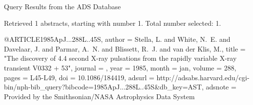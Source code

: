 Query Results from the ADS Database


Retrieved 1 abstracts, starting with number 1.  Total number selected: 1.

@ARTICLE{1985ApJ...288L..45S,
   author = {{Stella}, L. and {White}, N.~E. and {Davelaar}, J. and {Parmar}, A.~N. and 
	{Blissett}, R.~J. and {van der Klis}, M.},
    title = "{The discovery of 4.4 second X-ray pulsations from the rapidly variable X-ray transient V0332 + 53}",
  journal = {\apjl},
     year = 1985,
    month = jan,
   volume = 288,
    pages = {L45-L49},
      doi = {10.1086/184419},
   adsurl = {http://adsabs.harvard.edu/cgi-bin/nph-bib_query?bibcode=1985ApJ...288L..45S&db_key=AST},
  adsnote = {Provided by the Smithsonian/NASA Astrophysics Data System}
}


